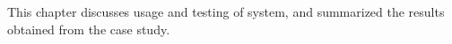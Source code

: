This chapter discusses usage and testing of system, and summarized the results obtained from the case study.